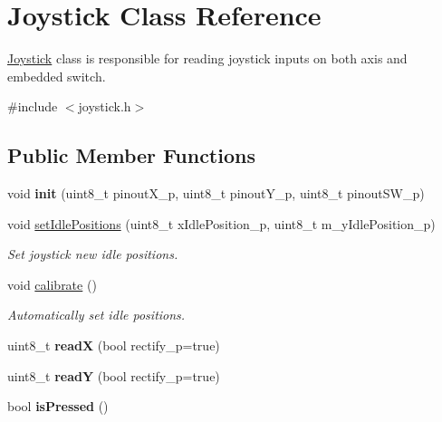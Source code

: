 \hypertarget{class_joystick}{}\section{Joystick Class Reference}
\label{class_joystick}


\hyperlink{class_joystick}{Joystick} class is responsible for reading joystick inputs on both axis and embedded switch.  




{\ttfamily \#include $<$joystick.\+h$>$}

\subsection*{Public Member Functions}
\begin{DoxyCompactItemize}
\item 
\mbox{\label{class_joystick_add56a0e9f92176c9f12e3f12e3983588}} 
void {\bfseries init} (uint8\+\_\+t pinout\+X\+\_\+p, uint8\+\_\+t pinout\+Y\+\_\+p, uint8\+\_\+t pinout\+S\+W\+\_\+p)
\item 
void \hyperlink{class_joystick_a70f101e3395a939fb757522b14d830c9}{set\+Idle\+Positions} (uint8\+\_\+t x\+Idle\+Position\+\_\+p, uint8\+\_\+t m\+\_\+y\+Idle\+Position\+\_\+p)
\begin{DoxyCompactList}\small\item\em Set joystick new idle positions. \end{DoxyCompactList}\item 
void \hyperlink{class_joystick_ae2a8edfcf0aa98fba3e4bfb31ebc8200}{calibrate} ()
\begin{DoxyCompactList}\small\item\em Automatically set idle positions. \end{DoxyCompactList}\item 
\mbox{\label{class_joystick_a9f5a1ee24e763f47f60759ce35054d92}} 
uint8\+\_\+t {\bfseries readX} (bool rectify\+\_\+p=true)
\item 
\mbox{\label{class_joystick_a53dd4c36d46f475c330ef570e62640a7}} 
uint8\+\_\+t {\bfseries readY} (bool rectify\+\_\+p=true)
\item 
\mbox{\label{class_joystick_a67821faa398aede9f7303ee69e2e1348}} 
bool {\bfseries is\+Pressed} ()

\end{DoxyCompactItemize}

